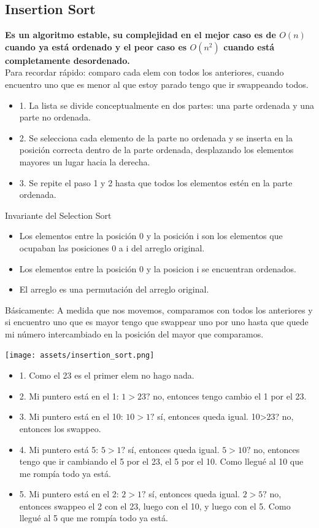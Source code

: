 \documentclass[10pt,a4paper]{article}
\begin{document}
\subsection*{Insertion Sort}
\textbf{Es un algoritmo estable, su complejidad en el mejor caso es de $O(n)$ cuando ya está ordenado y el peor caso es $O(n^{2})$ cuando está completamente desordenado.} \\
Para recordar rápido: comparo cada elem con todos los anteriores, cuando encuentro uno que es menor al que estoy parado tengo que ir swappeando todos.
\begin{itemize}
   \item 1. La lista se divide conceptualmente en dos partes: una parte ordenada y una parte no ordenada.
   \item 2. Se selecciona cada elemento de la parte no ordenada y se inserta en la posición correcta dentro de la parte ordenada, desplazando los elementos mayores un lugar hacia la derecha.
   \item 3. Se repite el paso 1 y 2 hasta que todos los elementos estén en la parte ordenada.
\end{itemize}
Invariante del Selection Sort
\begin{itemize}
    \item Los elementos entre la posición 0 y la posición i son los elementos que ocupaban las posiciones 0 a i del arreglo original.
    \item Los elementos entre la posición 0 y la posicion i se encuentran ordenados.
    \item El arreglo es una permutación del arreglo original.
\end{itemize}
Básicamente: A medida que nos movemos, comparamos con todos los anteriores y si encuentro uno que es mayor tengo que swappear uno por uno hasta que quede mi número intercambiado en la posición del mayor que comparamos.
\begin{center}
    \begin{minipage}[b]{0.5\textwidth}
        \texttt{[image: assets/insertion\_sort.png]}
        \centering
        \label{fig:insertion_sort}
    \end{minipage}
\end{center}
\begin{itemize}
    \item 1. Como el 23 es el primer elem no hago nada.
    \item 2. Mi puntero está en el 1: $1>23?$ no, entonces tengo cambio el 1 por el 23.
    \item 3. Mi puntero está en el 10: $10>1?$ sí, entonces queda igual. 10>23? no, entonces los swappeo.
    \item 4. Mi puntero está 5: $5>1?$ sí, entonces queda igual. $5>10?$ no, entonces tengo que ir cambiando el 5 por el 23, el 5 por el 10. Como llegué al 10 que me rompía todo ya está.
    \item 5. Mi puntero está en el 2: $2>1?$ sí, entonces queda igual. $2>5?$ no, entonces swappeo el 2 con el 23, luego con el 10, y luego con el 5. Como llegué al 5 que me rompía todo ya está.
\end{itemize}
\end{document}
